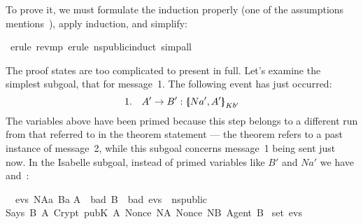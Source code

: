 \begin{isabellebody}
\isadelimproof
%
\endisadelimproof
%
\isatagproof
%
\begin{isamarkuptxt}%
To prove it, we must formulate the induction properly (one of the
assumptions mentions~), apply induction, and simplify:%
\end{isamarkuptxt}%
\isamarkuptrue%
\isamarkupfalse%
\ {}erule\ rev{}mp{}\ erule\ ns{}public{}induct{}\ simp{}all{}%
\begin{isamarkuptxt}%
The proof states are too complicated to present in full.  
Let's examine the simplest subgoal, that for message~1.  The following
event has just occurred:
\[ 1.\quad  A'\to B'  : \mathopen{\{\kern-.30em|} Na',A'\mathclose{|\kern-.32em\}}\sb{Kb'} \]
The variables above have been primed because this step
belongs to a different run from that referred to in the theorem
statement --- the theorem
refers to a past instance of message~2, while this subgoal
concerns message~1 being sent just now.
In the Isabelle subgoal, instead of primed variables like $B'$ and $Na'$
we have  and~:
\begin{isabelle}%
\ {}{}\ {}evs{}\ NAa\ Ba{}\isanewline
{}A\ {}\ bad{}\ B\ {}\ bad{}\ evs{}\ {}\ ns{}public{}\isanewline
{}Says\ B\ A\ {}Crypt\ {}pubK\ A{}\ {}Nonce\ NA{}\ Nonce\ NB{}\ Agent\ B{}{}\isanewline
{}\ set\ evs{}\ {}\isanewline

\end{isabelle}
\end{isamarkuptxt}
\end{isabellebody}
